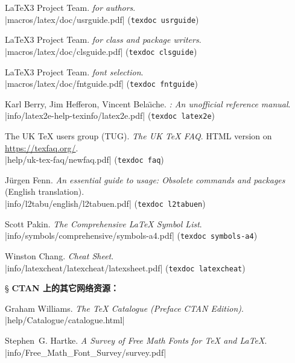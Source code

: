 \begin{thebibliography}{20}
 \LaTeX3 Project Team.
  \newblock \emph{\LaTeXe{} for authors}.\\
  \CTAN|macros/latex/doc/usrguide.pdf| (\texttt{texdoc usrguide})

 \LaTeX3 Project Team.
  \newblock \emph{\LaTeXe{} for class and package writers}. \\
  \CTAN|macros/latex/doc/clsguide.pdf| (\texttt{texdoc clsguide})

 \LaTeX3 Project Team.
  \newblock \emph{\LaTeXe{} font selection}. \\
  \CTAN|macros/latex/doc/fntguide.pdf| (\texttt{texdoc fntguide})

 Karl Berry, Jim Hefferon, Vincent Bela\"{\i}che.
  \newblock \emph{\LaTeXe: An unofficial reference manual}. \\
  \CTAN|info/latex2e-help-texinfo/latex2e.pdf| (\texttt{texdoc latex2e})

 The UK TeX users group (TUG).
  \newblock \emph{The UK TeX FAQ}.
  \newblock HTML version on \url{https://texfaq.org/}. \\
  \CTAN|help/uk-tex-faq/newfaq.pdf| (\texttt{texdoc faq})

 J\"{u}rgen Fenn.
  \newblock \emph{An essential guide to \LaTeXe{} usage: Obsolete commands and packages} (English translation). \\
  \CTAN|info/l2tabu/english/l2tabuen.pdf| (\texttt{texdoc l2tabuen})

 Scott Pakin.
  \newblock \emph{The Comprehensive \LaTeX{} Symbol List}. \\
  \CTAN|info/symbols/comprehensive/symbols-a4.pdf| (\texttt{texdoc symbols-a4})

 Winston Chang.
  \newblock \emph{\LaTeXe{} Cheat Sheet}. \\
  \CTAN|info/latexcheat/latexcheat/latexsheet.pdf| (\texttt{texdoc latexcheat})

\item[\S] {\bfseries CTAN 上的其它网络资源：}

 Graham Williams.
  \newblock \emph{The \TeX{} Catalogue (Preface CTAN Edition)}.\\
  \CTAN|help/Catalogue/catalogue.html|

 Stephen~G. Hartke.
  \newblock \emph{A Survey of Free Math Fonts for \TeX{} and \LaTeX}.\\
  \CTAN|info/Free_Math_Font_Survey/survey.pdf|


\end{thebibliography}
